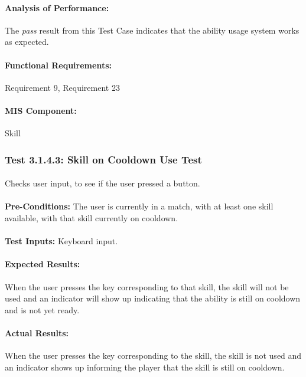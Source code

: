 \documentclass{article}
\begin{document}
    \paragraph{Analysis of Performance:}The \emph{pass} result from this Test Case indicates that the ability usage system works as expected.
    \paragraph{Functional Requirements:} Requirement 9, Requirement 23
    \paragraph{MIS Component:} Skill
    
    \subsubsection{Test 3.1.4.3: Skill on Cooldown Use Test}
    \paragraph{}\textbf{}
    \paragraph{}Checks user input, to see if the user pressed a button.
    \paragraph{}\textbf{Pre-Conditions:} The user is currently in a match, with at least one skill available, with that skill currently on cooldown.
    \paragraph{}\textbf{Test Inputs:} Keyboard input.
    \paragraph{Expected Results:} When the user presses the key corresponding to that skill, the skill will not be used and an indicator will show up indicating that the ability is still on cooldown and is not yet ready.
    \paragraph{Actual Results:} When the user presses the key corresponding to the skill, the skill is not used and an indicator shows up informing the player that the skill is still on cooldown.
\end{document}
